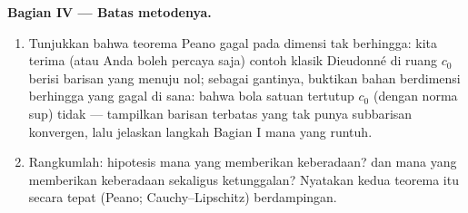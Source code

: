 \begin{problem}[{Soal akhir pekan --- keberadaan penyelesaian
$x' = f(t, x)$ tanpa Lipschitz}]
\medskip
\noindent\textbf{Bagian IV --- Batas metodenya.}
\begin{enumerate}[resume]
  \item Tunjukkan bahwa teorema Peano gagal pada dimensi tak berhingga:
        kita terima (atau Anda boleh percaya saja) contoh klasik
        Dieudonné di ruang $c_0$ berisi barisan yang menuju nol;
        sebagai gantinya, buktikan bahan berdimensi berhingga yang gagal di sana:
        bahwa bola satuan tertutup $c_0$ (dengan norma sup) tidak  --- tampilkan
        barisan terbatas yang tak punya subbarisan konvergen, lalu jelaskan
        langkah Bagian I mana yang runtuh.
  \item Rangkumlah: hipotesis mana yang memberikan keberadaan? dan mana yang memberikan keberadaan
        sekaligus ketunggalan? Nyatakan kedua teorema itu secara tepat
        (Peano; Cauchy--Lipschitz) berdampingan.
\end{enumerate}


\end{problem}
